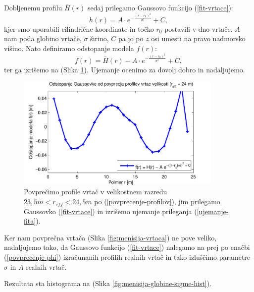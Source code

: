 \documentclass[a4paper, twoside, 12pt]{book}
\begin{document}
Dobljenemu profilu $\bar H(r)$ sedaj prilegamo Gaussovo funkcijo (\ref{fit-vrtace}):
\begin{equation}
  h(r) = A \cdot e^{-\frac{(r-r_0)^2}{\sigma^2}} + C,
  \label{fit-vrtace}
\end{equation}
kjer smo uporabili cilindrične koordinate in točko $r_0$ postavili v dno vrtače. $A$ nam poda globino vrtače, $\sigma$ širino, $C$ pa jo po $z$ osi umesti na pravo nadmorsko višino. Nato definiramo odstopanje modela $f(r)$:
\begin{equation}
  f(r) = \bar{H}(r) - A \cdot e^{-\frac{(r-r_0)^2}{\sigma^2}} + C,
  \label{ujemanje-fita}
\end{equation}
ter ga izrišemo na (Slika \ref{fig:menisija-profil-21-fit}). Ujemanje ocenimo za dovolj dobro in nadaljujemo.

  \begin{figure}[h!]
    \begin{center}
      \includegraphics[width=10cm]{slike/menisija-profil-21-fit}
    \end{center}
    \caption{Povprečimo profile vrtač v velikostnem razredu $23,5m < r_{eff} < 24,5m$ po (\ref{povprecenje-profilov}), jim prilegamo Gaussovko (\ref{fit-vrtace}) in izrišemo ujemanje prileganja (\ref{ujemanje-fita}).}
    \label{fig:menisija-profil-21-fit}
  \end{figure}

Ker nam povprečna vrtača (Slika \ref{fig:menisija-vrtaca}) ne pove veliko, nadaljujemo tako, da Gaussovo funkcijo (\ref{fit-vrtace}) nalegamo na prej po enačbi (\ref{povprecenje-phi}) izračunanih profilih realnih vrtač in tako izluščimo parametre $\sigma$ in $A$ realnih vrtač.

Rezultata sta histograma na (Slika \ref{fig:menisija-globine-sigme-hist}).
\end{document}
